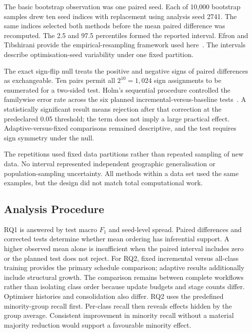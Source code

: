 \documentclass[conference,10pt]{IEEEtran}
\begin{document}
The basic bootstrap observation was one paired seed. Each of 10,000 bootstrap samples drew ten seed indices with replacement using analysis seed 2741. The same indices selected both methods before the mean paired difference was recomputed. The 2.5 and 97.5 percentiles formed the reported interval. Efron and Tibshirani provide the empirical-resampling framework used here~\cite{efron1993}. The intervals describe optimisation-seed variability under one fixed partition.

The exact sign-flip null treats the positive and negative signs of paired differences as exchangeable. Ten pairs permit all $2^{10}=1,024$ sign assignments to be enumerated for a two-sided test. Holm's sequential procedure controlled the familywise error rate across the six planned incremental-versus-baseline tests~\cite{holm1979}. A statistically significant result means rejection after that correction at the predeclared 0.05 threshold; the term does not imply a large practical effect. Adaptive-versus-fixed comparisons remained descriptive, and the test requires sign symmetry under the null.

The repetitions used fixed data partitions rather than repeated sampling of new data. No interval represented independent geographic generalisation or population-sampling uncertainty. All methods within a data set used the same examples, but the design did not match total computational work.

\subsection{Analysis Procedure}

RQ1 is answered by test macro $F_1$ and seed-level spread. Paired differences and corrected tests determine whether mean ordering has inferential support. A higher observed mean alone is insufficient when the paired interval includes zero or the planned test does not reject. For RQ2, fixed incremental versus all-class training provides the primary schedule comparison; adaptive results additionally include structural growth. The comparison remains between complete workflows rather than isolating class order because update budgets and stage counts differ. Optimiser histories and consolidation also differ. RQ2 uses the predefined minority-group recall first. Per-class recall then reveals effects hidden by the group average. Consistent improvement in minority recall without a material majority reduction would support a favourable minority effect.
\end{document}
